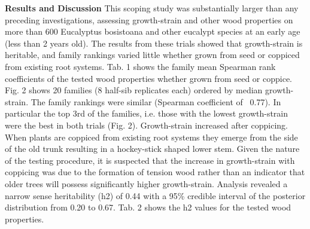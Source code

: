 \textbf{Results and Discussion}
This scoping study was substantially larger than any preceding investigations, assessing growth-strain and other wood properties on more than 600 Eucalyptus bosistoana and other eucalypt species at an early age (less than 2 years old). The results from these trials showed that growth-strain is heritable, and family rankings varied little whether grown from seed or coppiced from existing root systems. Tab. 1 shows the family mean Spearman rank coefficients of the tested wood properties whether grown from seed or coppice. Fig. 2 shows 20 families (8 half-sib replicates each) ordered by median growth-strain. The family rankings were similar (Spearman coefficient of ~0.77). In particular the top 3rd of the families, i.e. those with the lowest growth-strain were the best in both trials (Fig. 2). Growth-strain increased after coppicing. When plants are coppiced from existing root systems they emerge from the side of the old trunk resulting in a hockey-stick shaped lower stem. Given the nature of the testing procedure, it is suspected that the increase in growth-strain with coppicing was due to the formation of tension wood rather than an indicator that older trees will possess significantly higher growth-strain. Analysis revealed a narrow sense heritability (h2) of 0.44 with a 95\% credible interval of the posterior distribution from 0.20 to 0.67. Tab. 2 shows the h2 values for the tested wood properties.
